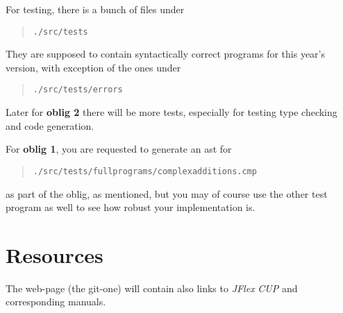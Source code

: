 \documentclass[10pt,freeform]{handout}[2014/08/13]
\begin{document}
For testing, there is a bunch of files under

\begin{quote}
  \texttt{./src/tests}
\end{quote}

They are supposed to contain syntactically correct programs for this year's
version, with exception of the ones under
\begin{quote}
  \texttt{./src/tests/errors}
\end{quote}
Later for \textbf{oblig 2} there will be more tests, especially for testing
type checking and code generation. 


For \textbf{oblig 1}, you are requested to generate an ast for
\begin{quote}
  \texttt{./src/tests/fullprograms/complexadditions.cmp}  
\end{quote}
as part of the oblig, as mentioned, but you may of course use the other
test program as well to see how robust your implementation is. 








\section{Resources}
\label{sec:resources}

The web-page (the git-one) will contain also links to \textsl{JFlex}
\textsl{CUP} and corresponding manuals.
\end{document}

